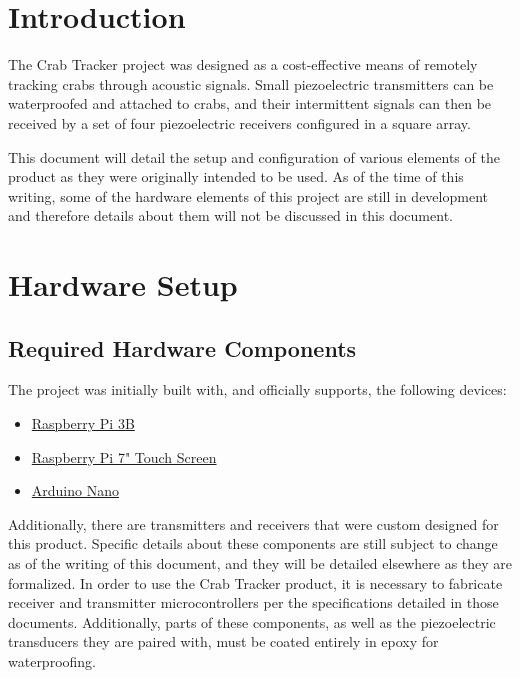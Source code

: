 \documentclass[12pt]{article}
\begin{document}
\section{Introduction}

The Crab Tracker project was designed as a cost-effective means of remotely
tracking crabs through acoustic signals.
Small piezoelectric transmitters can be waterproofed and attached to crabs,
and their intermittent signals can then be received by a set of four
piezoelectric receivers configured in a square array.

This document will detail the setup and configuration of various elements
of the product as they were originally intended to be used.
As of the time of this writing, some of the hardware elements of this project
are still in development and therefore details about them will not be discussed
in this document.

\section{Hardware Setup}

\subsection{Required Hardware Components}

The project was initially built with, and officially supports, the following
devices:
\begin{itemize}
\item \href{https://www.raspberrypi.org/products/raspberry-pi-3-model-b/}
	{Raspberry Pi 3B}
\item \href{https://www.raspberrypi.org/products/raspberry-pi-touch-display/}
	{Raspberry Pi 7" Touch Screen}
\item \href{https://store.arduino.cc/usa/arduino-nano}{Arduino Nano}
\end{itemize}

Additionally, there are transmitters and receivers that were custom designed
for this product.
Specific details about these components are still subject to change as of the
writing of this document, and they will be detailed elsewhere as they are
formalized.
In order to use the Crab Tracker product, it is necessary to fabricate
receiver and transmitter microcontrollers per the specifications detailed
in those documents.
Additionally, parts of these components, as well as the piezoelectric
transducers they are paired with, must be coated entirely in epoxy for
waterproofing.
\end{document}

